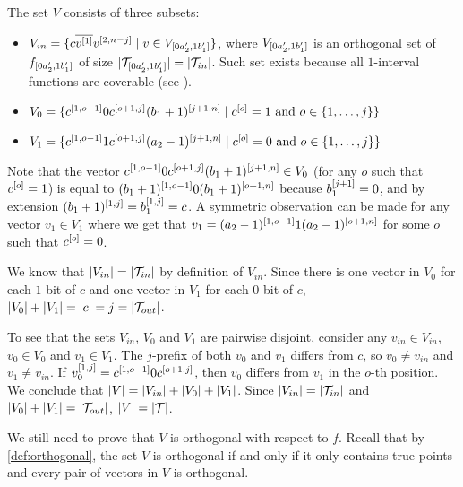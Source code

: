 The set $V$ consists of three subsets:
\begin{itemize}
\item $V_{in} = \{c \overline{v^{[1]}} v^{[2, n-j]}
\mid v \in V_{[0 a_2', 1 b_1']}\}$,
where $V_{[0 a_2', 1 b_1']}$ is an orthogonal set of $f_{[0 a_2', 1 b_1']}$
of size $\lvert\mathcal{T}_{[0 a_2', 1 b_1']}\rvert = \lvert\mathcal{T}_{in}\rvert$.
Such set exists because all $1$-interval functions
are coverable
(see ).

\item $V_0 =
\{c^{[1, o - 1]} 0 c^{[o + 1, j]} (b_1 + 1)^{[j+1, n]}
\mid c^{[o]} = 1 \text{ and } o \in \{1, \ldots, j\}\}$

\item $V_1 =
\{c^{[1, o - 1]} 1 c^{[o + 1, j]} (a_2 - 1)^{[j+1, n]}
\mid c^{[o]} = 0 \text{ and } o \in \{1, \ldots, j\}\}$
\end{itemize}

Note that the vector
$c^{[1, o - 1]} 0 c^{[o + 1, j]} (b_1 + 1)^{[j+1, n]} \in V_0$
(for any $o$ such that $c^{[o]} = 1$)
is equal to
$(b_1+1)^{[1, o - 1]} 0 (b_1+1)^{[o + 1, n]}$
because $b_1^{[j+1]} = 0$,
and by extension
$(b_1+1)^{[1, j]} = b_1^{[1, j]} = c$.
A symmetric observation can be made
for any vector $v_1 \in V_1$
where we get that
$v_1 = (a_2-1)^{[1, o-1]} 1 (a_2-1)^{[o+1, n]}$
for some $o$ such that $c^{[o]} = 0$.

We know that
$\lvert V_{in}\rvert = \lvert\mathcal{T}_{in}\rvert$
by definition of $V_{in}$.
Since there is one vector in $V_0$
for each $1$ bit of $c$
and one vector in $V_1$
for each $0$ bit of $c$,
$\lvert V_0\rvert + \lvert V_1\rvert = \lvert c\rvert = j = \lvert\mathcal{T}_{out}\rvert$.

To see that the sets $V_{in}$, $V_0$ and $V_1$ are pairwise disjoint,
consider any $v_{in} \in V_{in}$, $v_0 \in V_0$ and $v_1 \in V_1$.
The $j$-prefix of both $v_0$ and $v_1$ differs from $c$,
so $v_0 \neq v_{in}$ and $v_1 \neq v_{in}$.
If $v_0^{[1, j]} = c^{[1, o-1]} 0 c^{[o+1, j]}$,
then $v_0$ differs from $v_1$ in the $o$-th position.
We conclude that $\lvert V\rvert = \lvert V_{in}\rvert + \lvert V_0\rvert + \lvert V_1\rvert$.
Since $\lvert V_{in}\rvert = \lvert\mathcal{T}_{in}\rvert$
and $\lvert V_0\rvert + \lvert V_1\rvert = \lvert\mathcal{T}_{out}\rvert$,
$\lvert V\rvert = \lvert\mathcal{T}\rvert$.

We still need to prove that $V$ is orthogonal
with respect to $f$.
Recall that by \cref{def:orthogonal},
the set $V$ is orthogonal
if and only if
it only contains true points
and every pair of vectors in $V$ is orthogonal.

